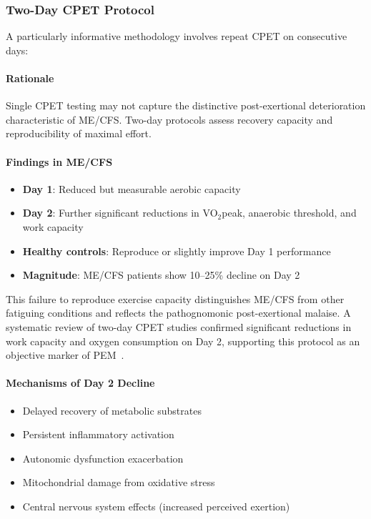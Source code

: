 \subsubsection{Two-Day CPET Protocol}

A particularly informative methodology involves repeat CPET on consecutive days:

\paragraph{Rationale}
Single CPET testing may not capture the distinctive post-exertional deterioration characteristic of ME/CFS. Two-day protocols assess recovery capacity and reproducibility of maximal effort.

\paragraph{Findings in ME/CFS}
\begin{itemize}
    \item \textbf{Day 1}: Reduced but measurable aerobic capacity
    \item \textbf{Day 2}: Further significant reductions in VO$_2$peak, anaerobic threshold, and work capacity
    \item \textbf{Healthy controls}: Reproduce or slightly improve Day 1 performance
    \item \textbf{Magnitude}: ME/CFS patients show 10--25\% decline on Day 2~\cite{keller2024cpet,Lim2020}
\end{itemize}

This failure to reproduce exercise capacity distinguishes ME/CFS from other fatiguing conditions and reflects the pathognomonic post-exertional malaise. A systematic review of two-day CPET studies confirmed significant reductions in work capacity and oxygen consumption on Day 2, supporting this protocol as an objective marker of PEM~\cite{Lim2020}.

\paragraph{Mechanisms of Day 2 Decline}
\begin{itemize}
    \item Delayed recovery of metabolic substrates
    \item Persistent inflammatory activation
    \item Autonomic dysfunction exacerbation
    \item Mitochondrial damage from oxidative stress
    \item Central nervous system effects (increased perceived exertion)
\end{itemize}

